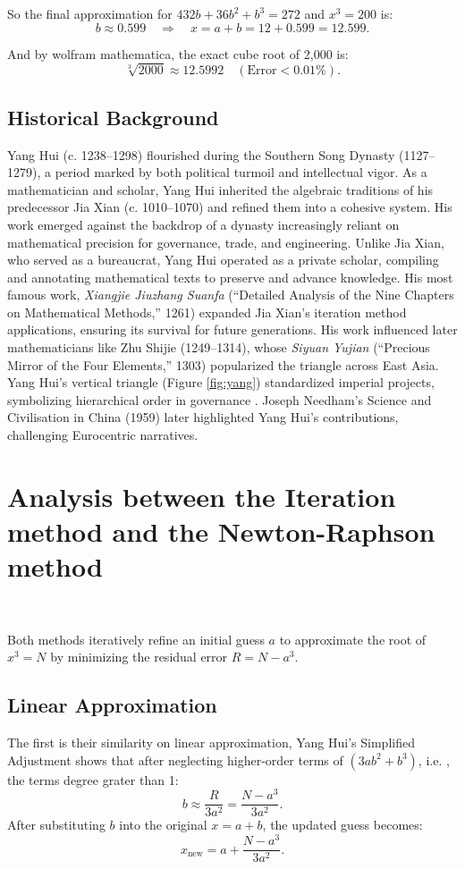 \documentclass{article}
\begin{document}
So the final approximation for $432b+36b^2+b^3=272$ and $x^3=200$ is:
\[
b \approx 0.599 \quad \Rightarrow \quad x = a + b = 12 + 0.599 = \boxed{12.599}.
\]

And by wolfram mathematica, the exact cube root of 2,000 is:
\[
\sqrt[3]{2000} \approx 12.5992 \quad (\text{Error} < 0.01\%).
\]

\subsection{Historical Background}

Yang Hui (c. 1238–1298) flourished during the Southern Song Dynasty (1127–1279), a period marked by both political turmoil and intellectual vigor. As a mathematician and scholar, Yang Hui inherited the algebraic traditions of his predecessor Jia Xian (c. 1010–1070) and refined them into a cohesive system. His work emerged against the backdrop of a dynasty increasingly reliant on mathematical precision for governance, trade, and engineering. Unlike Jia Xian, who served as a bureaucrat, Yang Hui operated as a private scholar, compiling and annotating mathematical texts to preserve and advance knowledge. His most famous work, \textit{Xiangjie Jiuzhang Suanfa} (“Detailed Analysis of the Nine Chapters on Mathematical Methods,” 1261) expanded Jia Xian's iteration method applications, ensuring its survival for future generations. His work influenced later mathematicians like Zhu Shijie (1249–1314), whose \textit{Siyuan Yujian} (“Precious Mirror of the Four Elements,” 1303) popularized the triangle across East Asia. Yang Hui’s vertical triangle (Figure \ref{fig:yang}) standardized imperial projects, symbolizing hierarchical order in governance \cite{needham1993}. Joseph Needham’s Science and Civilisation in China (1959) later highlighted Yang Hui’s contributions, challenging Eurocentric narratives.

\section{Analysis between the Iteration method and the Newton-Raphson method}

~

Both methods iteratively refine an initial guess \(a\) to approximate the root of \(x^3 = N\) by minimizing the residual error \(R = N - a^3\).

\subsection{Linear Approximation}
The first is their similarity on linear approximation, Yang Hui's Simplified Adjustment shows that after neglecting higher-order terms of \((3ab^2 + b^3)\), i.e. , the terms degree grater than 1:
\[
b \approx \frac{R}{3a^2} = \frac{N - a^3}{3a^2}.
\]
After substituting $b$ into the original $x=a+b$, the updated guess becomes:
\[
x_{\text{new}} = a + \frac{N - a^3}{3a^2}.
\]
\end{document}
